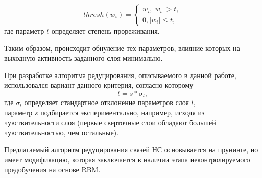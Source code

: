 \begin{equation*}
	thresh(w_i) = 
	\begin{cases}
		w_i, |w_i| > t,\\
		0, |w_i| \leq t,
	\end{cases}
\end{equation*}
где параметр $t$ определяет степень прореживания.

Таким образом, происходит обнуление тех параметров, влияние которых на выходную активность заданного слоя минимально.

При разработке алгоритма редуцирования, описываемого в данной работе, использовался вариант данного критерия, согласно которому 
\begin{equation*}
	t = s * \sigma_l,	
\end{equation*}
где $\sigma_l$ определяет стандартное отклонение параметров слоя $l$,\\
параметр $s$ подбирается экспериментально, например, исходя из чувствительности слоя (первые сверточные слои обладают большей чувствительностью, чем остальные).

Предлагаемый алгоритм редуцирования связей НС основывается на прунинге, но имеет модификацию, которая заключается в наличии этапа неконтролируемого предобучения на основе RBM.

